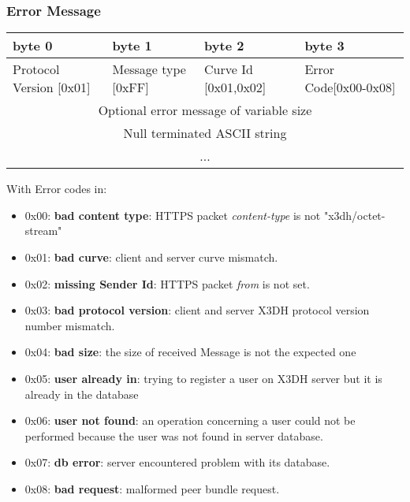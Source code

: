 \documentclass[a4paper,11pt]{article}
\begin{document}
    \subsubsection{Error Message}
      \begin{center}
      \begin{tabular}{ | p{1.4in} | p{1.4in} | p{1.4in} | p{1.4in} |}
        \hline
        \cellcolor[gray]{0.85} byte 0 & \cellcolor[gray]{0.85} byte 1 & \cellcolor[gray]{0.85} byte 2 & \cellcolor[gray]{0.85}byte 3\\
        \hline
        Protocol Version [0x01] & Message type [0xFF] & Curve Id [0x01,0x02] & Error Code[0x00-0x08]\\
        \hline
        \multicolumn{4}{|c|}{Optional error message of variable size}\\
        \multicolumn{4}{|c|}{Null terminated ASCII string}\\
        \multicolumn{4}{|c|}{...}\\
        \hline        
      \end{tabular}
      \end{center}

    With Error codes in:
    \begin{itemize}
      \item 0x00: \textbf{bad content type}: HTTPS packet \textit{content-type} is not "x3dh/octet-stream"
      \item 0x01: \textbf{bad curve}: client and server curve mismatch.
      \item 0x02: \textbf{missing Sender Id}: HTTPS packet \textit{from} is not set.
      \item 0x03: \textbf{bad protocol version}: client and server X3DH protocol version number mismatch.
      \item 0x04: \textbf{bad size}: the size of received Message is not the expected one
      \item 0x05: \textbf{user already in}: trying to register a user on X3DH server but it is already in the database
      \item 0x06: \textbf{user not found}: an operation concerning a user could not be performed because the user was not found in server database.
      \item 0x07: \textbf{db error}: server encountered problem with its database.
      \item 0x08: \textbf{bad request}: malformed peer bundle request.
    \end{itemize}
\end{document}
